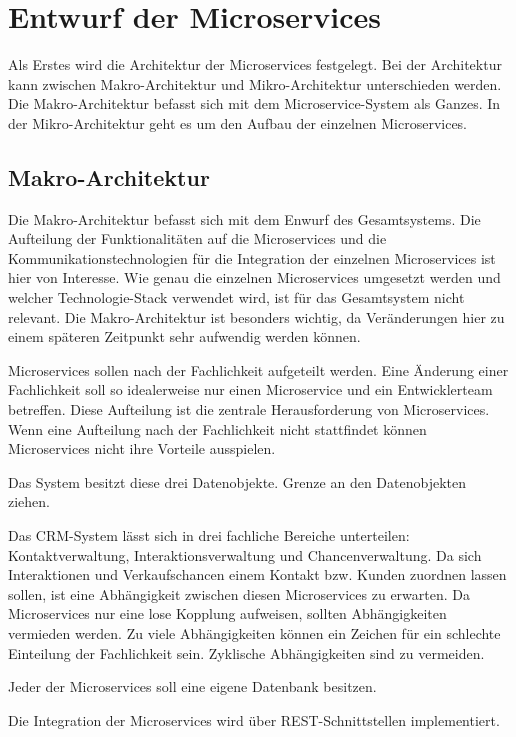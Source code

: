 \section{Entwurf der Microservices}

Als Erstes wird die Architektur der Microservices festgelegt. Bei der Architektur kann zwischen Makro-Architektur und Mikro-Architektur unterschieden werden. Die Makro-Architektur befasst sich mit dem Microservice-System als Ganzes. In der Mikro-Architektur geht es um den Aufbau der einzelnen Microservices.

\subsection{Makro-Architektur}

Die Makro-Architektur befasst sich mit dem Enwurf des Gesamtsystems. Die Aufteilung der Funktionalitäten auf die Microservices und die Kommunikationstechnologien für die Integration der einzelnen Microservices ist hier von Interesse. Wie genau die einzelnen Microservices umgesetzt werden und welcher Technologie-Stack verwendet wird, ist für das Gesamtsystem nicht relevant. Die Makro-Architektur ist besonders wichtig, da Veränderungen hier zu einem späteren Zeitpunkt sehr aufwendig werden können.

Microservices sollen nach der Fachlichkeit aufgeteilt werden. Eine Änderung einer Fachlichkeit soll so idealerweise nur einen Microservice und ein Entwicklerteam betreffen. Diese Aufteilung ist die zentrale Herausforderung von Microservices. Wenn eine Aufteilung nach der Fachlichkeit nicht stattfindet können Microservices nicht ihre Vorteile ausspielen.

Das System besitzt diese drei Datenobjekte. Grenze an den Datenobjekten ziehen.

Das CRM-System lässt sich in drei fachliche Bereiche unterteilen: Kontaktverwaltung, Interaktionsverwaltung und Chancenverwaltung. Da sich Interaktionen und Verkaufschancen einem Kontakt bzw. Kunden zuordnen lassen sollen, ist eine Abhängigkeit zwischen diesen Microservices zu erwarten. Da Microservices nur eine lose Kopplung aufweisen, sollten Abhängigkeiten vermieden werden. Zu viele Abhängigkeiten können ein Zeichen für ein schlechte Einteilung der Fachlichkeit sein. Zyklische Abhängigkeiten sind zu vermeiden.

Jeder der Microservices soll eine eigene Datenbank besitzen.

Die Integration der Microservices wird über REST-Schnittstellen implementiert.


